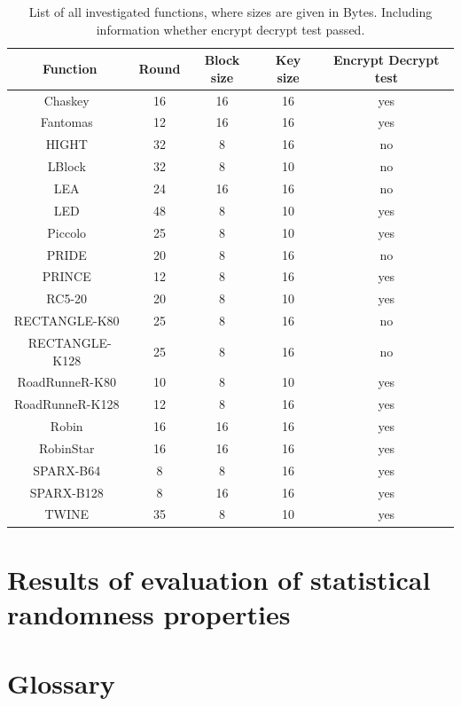 \documentclass[
    digital,    %
    oneside,    %
    color,
    11pt,
    nocover,
    notable,
    nolof,
    nolot,
    final
]{fithesis3}
\begin{document}
\begin{table}[t]
	\centering
	\begin{tabular}{c|c c c c}
		\textbf{\large Function} & \textbf{\large Round} & \textbf{\large Block size} & \textbf{\large Key size} & \textbf{\large Encrypt Decrypt test}\\ \hline
		Chaskey~\cite{cryptoeprint:2014:386}				& 16	& 16	& 16	& yes 	\\ \hline
		Fantomas~\cite{grosso2014ls}						& 12	& 16	& 16	& yes 	\\ \hline
		HIGHT~\cite{10.1007/11894063_4}						& 32	& 8		& 16	& no 	\\ \hline
		LBlock~\cite{10.1007/978-3-642-21554-4_19}			& 32	& 8		& 10	& no \\ \hline
		LEA~\cite{Hong2013LEAA1}							& 24	& 16	& 16	& no \\ \hline
		LED~\cite{Guo:2011:LBC:2044928.2044958}				& 48	& 8		& 10	& yes \\ \hline
		Piccolo~\cite{10.1007/978-3-642-23951-9_23}			& 25	& 8		& 10	& yes \\ \hline
		PRIDE~\cite{10.1007/978-3-662-44371-2_4}			& 20	& 8		& 16	& no  \\ \hline
		PRINCE~\cite{10.1007/978-3-642-34961-4_14}			& 12	& 8		& 16	& yes \\ \hline
		RC5-20~\cite{10.1007/3-540-60590-8_7}				& 20	& 8		& 10	& yes \\ \hline
		RECTANGLE-K80~\cite{Zhang2015}						& 25	& 8		& 16	& no \\ \hline
		RECTANGLE-K128~\cite{Zhang2015}						& 25	& 8		& 16	& no \\ \hline
		RoadRunneR-K80~\cite{10.1007/978-3-319-29078-2_4}	& 10	& 8		& 10	& yes \\ \hline
		RoadRunneR-K128~\cite{10.1007/978-3-319-29078-2_4}	& 12	& 8		& 16	& yes \\ \hline
		Robin~\cite{grosso2014ls}							& 16	& 16	& 16	& yes \\ \hline
		RobinStar~\cite{grosso2014ls}						& 16	& 16	& 16	& yes \\ \hline
		SPARX-B64~\cite{10.1007/978-3-662-53887-6_18}		& 8		& 8		& 16	& yes \\ \hline
		SPARX-B128~\cite{10.1007/978-3-662-53887-6_18}		& 8		& 16	& 16	& yes \\ \hline
		TWINE~\cite{twine}									& 35	& 8		& 10	& yes \\ \hline
		
		
	\end{tabular}
	\caption{List of all investigated functions, where sizes are given in Bytes. Including information whether encrypt decrypt test passed.}
	\label{table:list-of-investigated functions}
\end{table}



\chapter{Results of evaluation of statistical randomness properties}



\printbibliography[heading=bibintoc] %

\appendix{}

\chapter{Glossary}
\label{chap:app-glos}
\end{document}
